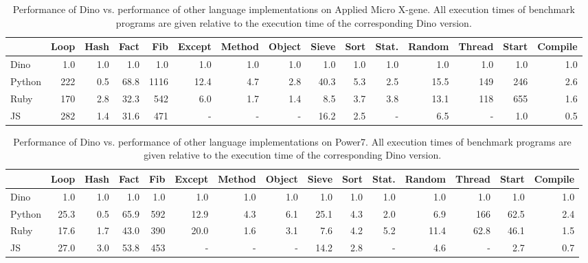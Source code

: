 \documentclass[preprint]{sigplanconf}
\begin{document}
\begin{table}[t]
\begin{center}
\begin{tabular}{|l|r|r|r||r|r|r|r|r|r|r|r|r|r|r|}
\hline

        &Loop   &Hash   &Fact   &Fib    &Except&Method&Object&Sieve&Sort   &Stat.&Random &Thread&Start&Compile\\ \hline
Dino    &1.0    &1.0    &1.0    &1.0    & 1.0  & 1.0  &1.0   & 1.0 &1.0    &1.0  &1.0    & 1.0  & 1.0 &1.0    \\
Python  &222    &0.5    & 68.8  &1116   &12.4  & 4.7  &2.8   &40.3 & 5.3   &2.5  &15.5   &149   &246  &2.6    \\
Ruby    &170    &2.8    &32.3   &  542  &  6.0 & 1.7  &1.4   & 8.5 & 3.7   &3.8  &13.1   &118   &655  &1.6    \\
JS      &282    &1.4    &31.6   &  471  &   -  &  -   &  -   & 16.2& 2.5   &  -  & 6.5   & -    & 1.0 &0.5    \\
\hline

\end{tabular}
\end{center}
\caption{Performance of Dino vs. performance of other language
  implementations on Applied Micro X-gene.  All execution times of benchmark programs are given relative to the execution time of the corresponding Dino version.}
\label{tab:X-gene}
\end{table}


\begin{table}[t]
\begin{center}
\begin{tabular}{|l|r|r|r||r|r|r|r|r|r|r|r|r|r|r|}
\hline
  
        &Loop   &Hash   &Fact   &Fib    &Except&Method&Object&Sieve&Sort   &Stat.&Random &Thread&Start&Compile\\ \hline
Dino    &1.0    &1.0    &1.0    &1.0    &1.0   &1.0   &1.0   &1.0  &1.0    &1.0  &1.0    &1.0   &1.0  &1.0    \\
Python  &25.3   &0.5    &65.9   &592    &12.9  &4.3   &6.1   &25.1 &4.3    &2.0  &6.9    &166   &62.5 &2.4    \\
Ruby    &17.6   &1.7    &43.0   &390    &20.0  &1.6   &3.1   &7.6  &4.2    &5.2  &11.4   &62.8  &46.1 &1.5    \\
JS      &27.0   &3.0    &53.8   &453    &   -  &   -  &  -   &14.2 &2.8    &  -  &4.6    &  -   &2.7  &0.7    \\
\hline

\end{tabular}
\end{center}
\caption{Performance of Dino vs. performance of other language
  implementations on Power7. All execution times of benchmark programs are given relative to the execution time of the corresponding Dino version.}
\label{tab:power7}
\end{table}
\end{document}

